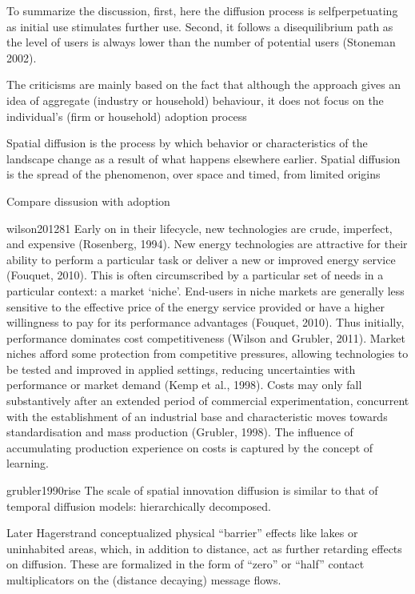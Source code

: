 \documentclass[
  authoryear,
  preprint,
  3p]{elsarticle}
\begin{document}
To summarize the discussion, first, here the diffusion process is
selfperpetuating as initial use stimulates further use. Second, it
follows a disequilibrium path as the level of users is always lower than
the number of potential users (Stoneman 2002).

The criticisms are mainly based on the fact that although the approach
gives an idea of aggregate (industry or household) behaviour, it does
not focus on the individual's (firm or household) adoption process

\citet{morrill2020spatial} Spatial diffusion is the process by which
behavior or characteristics of the landscape change as a result of what
happens elsewhere earlier. Spatial diffusion is the spread of the
phenomenon, over space and timed, from limited origins

Compare dissusion with adoption

wilson201281 Early on in their lifecycle, new technologies are crude,
imperfect, and expensive (Rosenberg, 1994). New energy technologies are
attractive for their ability to perform a particular task or deliver a
new or improved energy service (Fouquet, 2010). This is often
circumscribed by a particular set of needs in a particular context: a
market `niche'. End-users in niche markets are generally less sensitive
to the effective price of the energy service provided or have a higher
willingness to pay for its performance advantages (Fouquet, 2010). Thus
initially, performance dominates cost competitiveness (Wilson and
Grubler, 2011). Market niches afford some protection from competitive
pressures, allowing technologies to be tested and improved in applied
settings, reducing uncertainties with performance or market demand (Kemp
et al., 1998). Costs may only fall substantively after an extended
period of commercial experimentation, concurrent with the establishment
of an industrial base and characteristic moves towards standardisation
and mass production (Grubler, 1998). The influence of accumulating
production experience on costs is captured by the concept of learning.

grubler1990rise The scale of spatial innovation diffusion is similar to
that of temporal diffusion models: hierarchically decomposed.

\citet{grubler1990rise} Later Hagerstrand conceptualized physical
``barrier'' effects like lakes or uninhabited areas, which, in addition
to distance, act as further retarding effects on diffusion. These are
formalized in the form of ``zero'' or ``half'' contact multiplicators on
the (distance decaying) message flows.
\end{document}
